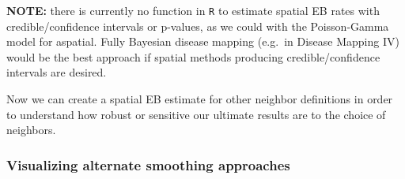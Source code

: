 \documentclass[
]{book}
\newenvironment{Shaded}{\begin{snugshade}}{\end{snugshade}}
\newcommand{\AttributeTok}[1]{\textcolor[rgb]{0.77,0.63,0.00}{#1}}
\newcommand{\CommentTok}[1]{\textcolor[rgb]{0.56,0.35,0.01}{\textit{#1}}}
\newcommand{\DecValTok}[1]{\textcolor[rgb]{0.00,0.00,0.81}{#1}}
\newcommand{\FunctionTok}[1]{\textcolor[rgb]{0.00,0.00,0.00}{#1}}
\newcommand{\NormalTok}[1]{#1}
\newcommand{\OtherTok}[1]{\textcolor[rgb]{0.56,0.35,0.01}{#1}}
\newcommand{\SpecialCharTok}[1]{\textcolor[rgb]{0.00,0.00,0.00}{#1}}
\newenvironment{rmdnote}[1]
  {
  \begin{itemize}
  \renewcommand{\labelitemi}{
    \raisebox{-.7\height}[0pt][0pt]{
      {\setkeys{Gin}{width=3em,keepaspectratio}\texttt{[image: images/\#1]}}
    }
  }
  \setlength{\fboxsep}{1em}
  \begin{note}
  \item
  }
  {
  \end{note}
  \end{itemize}
  }
\begin{document}
\begin{rmdnote}{note}
\textbf{NOTE:} there is currently no function in \texttt{R} to estimate spatial EB rates with credible/confidence intervals or p-values, as we could with the Poisson-Gamma model for aspatial. Fully Bayesian disease mapping (e.g.~in Disease Mapping IV) would be the best approach if spatial methods producing credible/confidence intervals are desired.

\end{rmdnote}

Now we can create a spatial EB estimate for other neighbor definitions in order to understand how robust or sensitive our ultimate results are to the choice of neighbors.

\begin{Shaded}
\end{Shaded}

\hypertarget{visualizing-alternate-smoothing-approaches}{%
\subsubsection{Visualizing alternate smoothing approaches}\label{visualizing-alternate-smoothing-approaches}}
\end{document}
